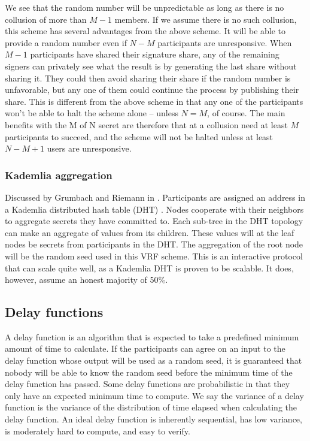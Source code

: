 We see that the random number will be unpredictable as long as there is no collusion of more than $M-1$ members. If we assume there is no such collusion, this scheme has several advantages from the above scheme. It will be able to provide a random number even if $N-M$ participants are unresponsive. When $M-1$ participants have shared their signature share, any of the remaining signers can privately see what the result is by generating the last share without sharing it. They could then avoid sharing their share if the random number is unfavorable, but any one of them could continue the process by publishing their share. This is different from the above scheme in that any one of the participants won't be able to halt the scheme alone – unless $N=M$, of course. The main benefits with the M of N secret are therefore that at a collusion need at least $M$ participants to succeed, and the scheme will not be halted unless at least $N - M + 1$ users are unresponsive.

\subsubsection{Kademlia aggregation}
Discussed by Grumbach and Riemann in \cite{grumbach_distributed_2017}. Participants are assigned an address in a Kademlia distributed hash table (DHT) \cite{maymounkov_kademlia_2002}. Nodes cooperate with their neighbors to aggregate secrets they have committed to. Each sub-tree in the DHT topology can make an aggregate of values from its children. These values will at the leaf nodes be secrets from participants in the DHT. The aggregation of the root node will be the random seed used in this VRF scheme. 
This is an interactive protocol that can scale quite well, as a Kademlia DHT is proven to be scalable. It does, however, assume an honest majority of 50\%. 

\subsection{Delay functions}
A delay function is an algorithm that is expected to take a predefined minimum amount of time to calculate. If the participants can agree on an input to the delay function whose output will be used as a random seed, it is guaranteed that nobody will be able to know the random seed before the minimum time of the delay function has passed. Some delay functions are probabilistic in that they only have an expected minimum time to compute. We say the variance of a delay function is the variance of the distribution of time elapsed when calculating the delay function. An ideal delay function is inherently sequential, has low variance, is moderately hard to compute, and easy to verify.


